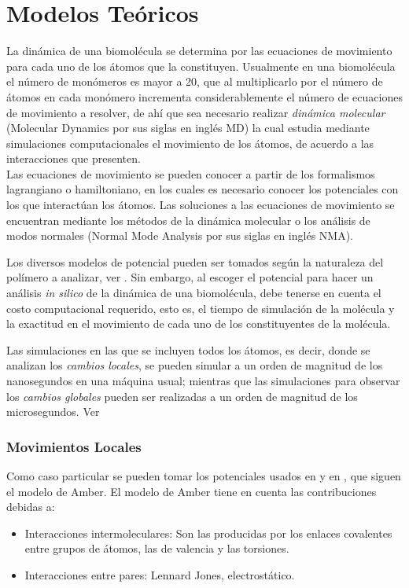 \chapter{Modelos Te\'{o}ricos}
La din\'{a}mica de una biomol\'{e}cula se determina por las ecuaciones de movimiento para cada uno de los \'{a}tomos que la constituyen. Usualmente en una biomol\'{e}cula el n\'{u}mero de mon\'{o}meros es mayor a 20, que al multiplicarlo por el n\'{u}mero de \'{a}tomos en cada mon\'{o}mero incrementa considerablemente el n\'{u}mero de ecuaciones de movimiento a resolver, de ah\'{i} que sea necesario realizar \textit{din\'{a}mica molecular} (Molecular Dynamics por sus siglas en ingl\'{e}s MD) la cual estudia mediante simulaciones computacionales el movimiento de los \'{a}tomos, de acuerdo a las interacciones que presenten.\\

Las ecuaciones de movimiento se pueden conocer a partir de los formalismos lagrangiano o hamiltoniano, en los cuales es necesario conocer los potenciales con los que interact\'{u}an los \'{a}tomos. Las soluciones a las ecuaciones de movimiento se encuentran mediante los m\'{e}todos de la din\'{a}mica molecular o los an\'{a}lisis de modos normales (Normal Mode Analysis por sus siglas en ingl\'{e}s NMA).

Los diversos modelos de potencial pueden ser tomados según la naturaleza del pol\'{i}mero a analizar, ver \cite{Amb1}. Sin embargo, al escoger el potencial  para hacer un an\'{a}lisis \textit{in silico} de la din\'{a}mica de una biomol\'{e}cula, debe tenerse en cuenta el costo computacional requerido, esto es, el tiempo de simulaci\'{o}n de la mol\'{e}cula y la exactitud en el movimiento de cada uno de los constituyentes de la mol\'{e}cula.

Las simulaciones en las que se incluyen todos los \'{a}tomos, es decir, donde se analizan los \textit{cambios locales}, se pueden simular a un orden de magnitud de los nanosegundos en una m\'{a}quina usual; mientras que las simulaciones para observar los \textit{cambios globales} pueden ser realizadas a un orden de magnitud de los microsegundos. Ver 
\subsection{Movimientos Locales}
Como caso particular se pueden tomar los potenciales usados en \cite{Amb1} y en \cite{web:Amb2}, que siguen el modelo de Amber. El modelo de Amber tiene en cuenta las contribuciones debidas a:
 \begin{itemize}
\item Interacciones intermoleculares: Son las producidas por los enlaces covalentes entre grupos de \'{a}tomos, las de valencia y las torsiones.
\item Interacciones entre pares: Lennard Jones, electrost\'{a}tico.
\end{itemize}

